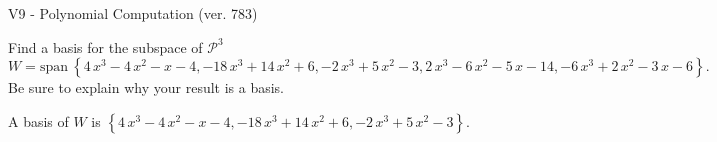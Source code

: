 \begin{exercise}
  \begin{exerciseTitle}V9 - Polynomial Computation (ver. 783)\end{exerciseTitle}
  \begin{exerciseStatement}
    Find a basis for the subspace of \(\mathcal{P}^3\) 
\[W=\mathrm{span}\ \left\{4 \, x^{3} - 4 \, x^{2} - x - 4 , -18 \, x^{3} + 14 \, x^{2} + 6 , -2 \, x^{3} + 5 \, x^{2} - 3 , 2 \, x^{3} - 6 \, x^{2} - 5 \, x - 14 , -6 \, x^{3} + 2 \, x^{2} - 3 \, x - 6\right\}.\]
 Be sure to explain why your result is a basis.


  \end{exerciseStatement}
  \begin{exerciseAnswer}
   A basis of \(W\) is  \(\left\{4 \, x^{3} - 4 \, x^{2} - x - 4 , -18 \, x^{3} + 14 \, x^{2} + 6 , -2 \, x^{3} + 5 \, x^{2} - 3\right\}\).
  


  \end{exerciseAnswer}
\end{exercise}